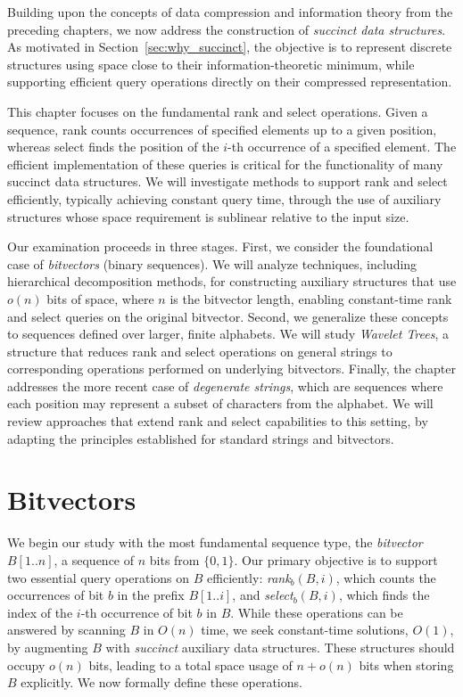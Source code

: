 Building upon the concepts of data compression and information theory from the preceding chapters, we now address the construction of \emph{succinct data structures}. As motivated in Section~\ref{sec:why_succinct}, the objective is to represent discrete structures using space close to their information-theoretic minimum, while supporting efficient query operations directly on their compressed representation.

This chapter focuses on the fundamental \textsf{rank} and \textsf{select} operations. Given a sequence, \textsf{rank} counts occurrences of specified elements up to a given position, whereas \textsf{select} finds the position of the $i$-th occurrence of a specified element. The efficient implementation of these queries is critical for the functionality of many succinct data structures. We will investigate methods to support \textsf{rank} and \textsf{select} efficiently, typically achieving constant query time, through the use of auxiliary structures whose space requirement is sublinear relative to the input size.

Our examination proceeds in three stages. First, we consider the foundational case of \emph{bitvectors} (binary sequences). We will analyze techniques, including hierarchical decomposition methods, for constructing auxiliary structures that use $o(n)$ bits of space, where $n$ is the bitvector length, enabling constant-time \textsf{rank} and \textsf{select} queries on the original bitvector. Second, we generalize these concepts to sequences defined over larger, finite alphabets. We will study \emph{Wavelet Trees}, a structure that reduces \textsf{rank} and \textsf{select} operations on general strings to corresponding operations performed on underlying bitvectors. Finally, the chapter addresses the more recent case of \emph{degenerate strings}, which are sequences where each position may represent a subset of characters from the alphabet. We will review approaches that extend \textsf{rank} and \textsf{select} capabilities to this setting, by adapting the principles established for standard strings and bitvectors.

\section{Bitvectors} \label{sec:bitvectors}
We begin our study with the most fundamental sequence type, the \emph{bitvector} $B[1..n]$, a sequence of $n$ bits from $\{0, 1\}$. Our primary objective is to support two essential query operations on $B$ efficiently: \emph{\textsf{rank}}$_b(B, i)$, which counts the occurrences of bit $b$ in the prefix $B[1..i]$, and \emph{\textsf{select}}$_b(B, i)$, which finds the index of the $i$-th occurrence of bit $b$ in $B$. While these operations can be answered by scanning $B$ in $O(n)$ time, we seek constant-time solutions, $O(1)$, by augmenting $B$ with \emph{succinct} auxiliary data structures. These structures should occupy $o(n)$ bits, leading to a total space usage of $n+o(n)$ bits when storing $B$ explicitly. We now formally define these operations.

